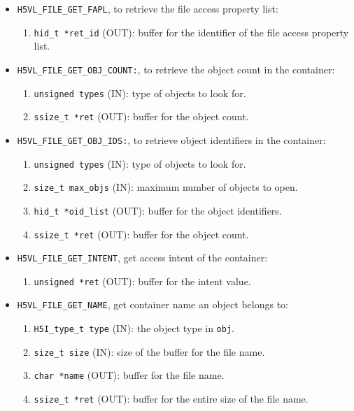 \begin{mdframed}[style=bgbox]
\begin{itemize}
\item \texttt{H5VL\_FILE\_GET\_FAPL}, to retrieve the file access
  property list:
  \begin{enumerate}
  \item \texttt{hid\_t *ret\_id} (OUT): buffer for the identifier of the
    file access property list.
  \end{enumerate}

\item \texttt{H5VL\_FILE\_GET\_OBJ\_COUNT:}, to retrieve the object count
  in the container:
  \begin{enumerate}
  \item \texttt{unsigned types} (IN): type of objects to look for.
  \item \texttt{ssize\_t *ret} (OUT): buffer for the object count.
  \end{enumerate}

\item \texttt{H5VL\_FILE\_GET\_OBJ\_IDS:}, to retrieve object identifiers
  in the container:
  \begin{enumerate}
  \item \texttt{unsigned types} (IN): type of objects to look for.
  \item \texttt{size\_t max\_objs} (IN): maximum number of objects to
    open.
  \item \texttt{hid\_t *oid\_list} (OUT): buffer for the object identifiers.
  \item \texttt{ssize\_t *ret} (OUT): buffer for the object count.
  \end{enumerate}

\item \texttt{H5VL\_FILE\_GET\_INTENT}, get access intent of the
  container:
  \begin{enumerate}
  \item \texttt{unsigned *ret} (OUT): buffer for the intent value.
  \end{enumerate}

\item \texttt{H5VL\_FILE\_GET\_NAME}, get container name an object
  belongs to:
  \begin{enumerate}
  \item \texttt{H5I\_type\_t type} (IN): the object type in \texttt{obj}.
  \item \texttt{size\_t size} (IN): size of the buffer for the file name.
  \item \texttt{char *name} (OUT): buffer for the file name.
  \item \texttt{ssize\_t *ret} (OUT): buffer for the entire size of the
    file name.
  \end{enumerate}


\end{itemize}
\end{mdframed}
